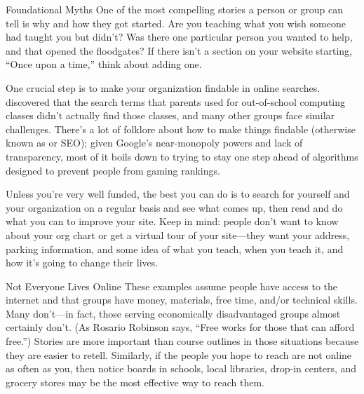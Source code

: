 \begin{aside}{Foundational Myths}
  One of the most compelling stories a person or group can tell is
  why and how they got started.
  Are you teaching what you wish someone had taught you but didn't?
  Was there one particular person you wanted to help,
  and that opened the floodgates?
  If there isn't a section on your website starting, ``Once upon a time,''
  think about adding one.
\end{aside}

One crucial step is to make your organization findable in online searches.
\cite{DiSa2014b} discovered that
the search terms that parents used for out-of-school computing classes
didn't actually find those classes,
and many other groups face similar challenges.
There's a lot of folklore about how to make things findable
(otherwise known as  or SEO);
given Google's near-monopoly powers and lack of transparency,
most of it boils down to trying to stay one step ahead of
algorithms designed to prevent people from gaming rankings.

Unless you're very well funded,
the best you can do is to search for yourself and your organization on a regular basis
and see what comes up,
then read 
and do what you can to improve your site.
Keep  in mind:
people don't want to know about your org chart or get a virtual tour of your site---they want your address,
parking information,
and some idea of what you teach,
when you teach it,
and how it's going to change their lives.

\begin{aside}{Not Everyone Lives Online}
  These examples assume people have access to the internet
  and that groups have money, materials, free time, and/or technical skills.
  Many don't---in fact,
  those serving economically disadvantaged groups almost certainly don't.
  (As Rosario Robinson says, ``Free works for those that can afford free.'')
  Stories are more important than course outlines in those situations
  because they are easier to retell.
  Similarly,
  if the people you hope to reach are not online as often as you,
  then notice boards in schools,
  local libraries,
  drop-in centers,
  and grocery stores may be the most effective way to reach them.
\end{aside}


